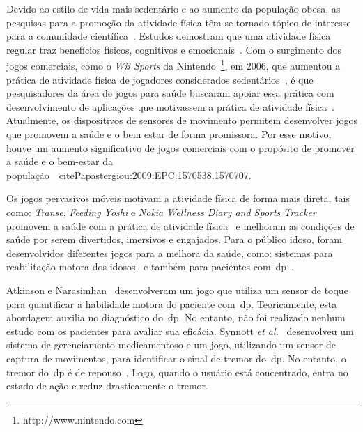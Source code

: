 Devido ao estilo de vida mais sedentário e ao aumento da população obesa, as pesquisas para a promoção da atividade física têm se tornado tópico de interesse para a comunidade científica~\cite{maitland2009,bartolome11,Mandryk2014}. Estudos demostram que uma atividade física regular traz benefícios físicos, cognitivos e emocionais~\cite{Mandryk2014}. Com o surgimento dos jogos comerciais, como o \textit{Wii Sports} da Nintendo~\footnote{http://www.nintendo.com}, em 2006, que aumentou a prática de atividade física de jogadores considerados sedentários~\cite{wiigraves2008}, é que pesquisadores da área de jogos para saúde buscaram apoiar essa prática com desenvolvimento de aplicações que motivassem a prática de atividade física~\cite{stacey2011}. Atualmente, os dispositivos de sensores de movimento permitem desenvolver jogos que promovem a saúde e o bem estar de forma promissora. Por esse motivo, houve um aumento significativo de jogos comerciais com o propósito de promover a saúde e o bem-estar da população~\
cite{Papastergiou:2009:EPC:1570538.1570707}.


Os jogos pervasivos móveis motivam a atividade física de forma mais direta, tais como: \textit{Transe}, \textit{Feeding Yoshi} e  \textit{Nokia Wellness Diary and Sports Tracker} promovem a saúde com a prática de atividade física~\cite{Suhonen:2008:SFE:1457199.1457204} e melhoram as condições de saúde por serem divertidos, imersivos e engajados. Para o público idoso, foram desenvolvidos diferentes jogos para a melhora da saúde, como: sistemas para reabilitação motora dos idosos~\cite{brox11} e também para pacientes com~\ac{dp}~\cite{atkinson2010,synnott_wiipd_2012,sacbespoke2014}. 

Atkinson e Narasimhan~\cite{atkinson2010} desenvolveram um jogo que utiliza um sensor de toque para quantificar a habilidade motora do paciente com~\ac{dp}. Teoricamente, esta abordagem auxilia no diagnóstico do~\ac{dp}. No entanto, não foi realizado nenhum estudo com os pacientes para avaliar sua eficácia. Synnott \textit{et al.}~\cite{synnott_wiipd_2012} desenvolveu um sistema de gerenciamento medicamentoso e um jogo, utilizando um sensor de captura de movimentos, para identificar o sinal de tremor do~\ac{dp}. No entanto, o tremor do~\ac{dp} é de repouso~\cite{national2006parkinson}. Logo, quando o usuário está concentrado, entra no estado de ação e reduz drasticamente o tremor.

